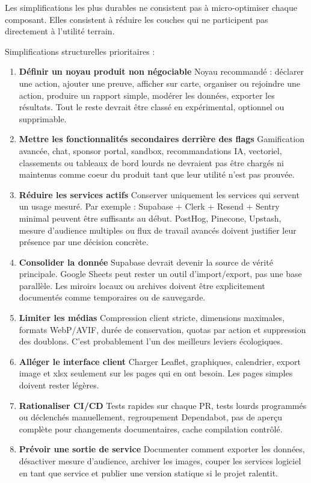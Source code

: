 \documentclass[
  10pt,
  a4paper,
  DIV=11,
  numbers=noendperiod,
  oneside]{scrreprt}
\let\oldtextbf\textbf
\renewcommand{\textbf}[1]{\oldtextbf{\textcolor{cmmnavy}{#1}}}
\begin{document}
Les simplifications les plus durables ne consistent pas à
micro-optimiser chaque composant. Elles consistent à réduire les couches
qui ne participent pas directement à l'utilité terrain.

Simplifications structurelles prioritaires :

\begin{enumerate}
\def\labelenumi{\arabic{enumi}.}
\item
  \textbf{Définir un noyau produit non négociable} Noyau recommandé :
  déclarer une action, ajouter une preuve, afficher sur carte, organiser
  ou rejoindre une action, produire un rapport simple, modérer les
  données, exporter les résultats. Tout le reste devrait être classé en
  expérimental, optionnel ou supprimable.
\item
  \textbf{Mettre les fonctionnalités secondaires derrière des flags}
  Gamification avancée, chat, sponsor portal, sandbox, recommandations
  IA, vectoriel, classements ou tableaux de bord lourds ne devraient pas
  être chargés ni maintenus comme coeur du produit tant que leur utilité
  n'est pas prouvée.
\item
  \textbf{Réduire les services actifs} Conserver uniquement les services
  qui servent un usage mesuré. Par exemple : Supabase + Clerk + Resend +
  Sentry minimal peuvent être suffisants au début. PostHog, Pinecone,
  Upstash, mesure d'audience multiples ou flux de travail avancés
  doivent justifier leur présence par une décision concrète.
\item
  \textbf{Consolider la donnée} Supabase devrait devenir la source de
  vérité principale. Google Sheets peut rester un outil d'import/export,
  pas une base parallèle. Les miroirs locaux ou archives doivent être
  explicitement documentés comme temporaires ou de sauvegarde.
\item
  \textbf{Limiter les médias} Compression client stricte, dimensions
  maximales, formats WebP/AVIF, durée de conservation, quotas par action
  et suppression des doublons. C'est probablement l'un des meilleurs
  leviers écologiques.
\item
  \textbf{Alléger le interface client} Charger Leaflet, graphiques,
  calendrier, export image et xlsx seulement sur les pages qui en ont
  besoin. Les pages simples doivent rester légères.
\item
  \textbf{Rationaliser CI/CD} Tests rapides sur chaque PR, tests lourds
  programmés ou déclenchés manuellement, regroupement Dependabot, pas de
  aperçu complète pour changements documentaires, cache compilation
  contrôlé.
\item
  \textbf{Prévoir une sortie de service} Documenter comment exporter les
  données, désactiver mesure d'audience, archiver les images, couper les
  services logiciel en tant que service et publier une version statique
  si le projet ralentit.
\end{enumerate}
\end{document}
